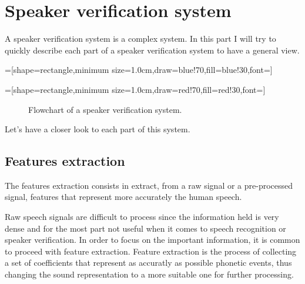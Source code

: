 \documentclass{techrep}
\begin{document}
\section{Speaker verification system}

A speaker verification system is a complex system. In this part I will
try to quickly describe each part of a speaker verification system to
have a general view.

=[shape=rectangle,minimum
  size=1.0cm,draw=blue!70,fill=blue!30,font=\small]

=[shape=rectangle,minimum
  size=1.0cm,draw=red!70,fill=red!30,font=\small]

\begin{figure}[H]
  \begin{center}
  \end{center}
  \caption{Flowchart of a speaker verification system.}
  \label{flowchart_svs}
\end{figure}

Let's have a closer look to each part of this system.

\subsection{Features extraction}

The features extraction consists in extract, from a raw signal or a
pre-processed signal, features that represent more accurately the
human speech.

Raw speech signals are difficult to process since the information held
is very dense and for the most part not useful when it comes to speech
recognition or speaker verification. In order to focus on the
important information, it is common to proceed with feature
extraction.  Feature extraction is the process of collecting a set of
coefficients that represent as accuratly as possible phonetic events,
thus changing the sound representation to a more suitable one for
further processing.
\end{document}
